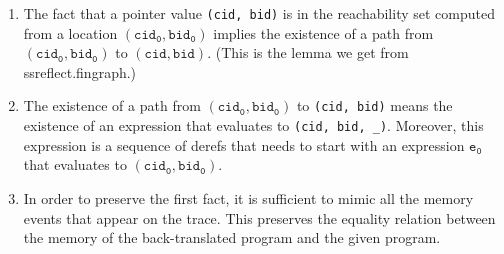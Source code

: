 \documentclass[12pt,a4paper]{article}
\begin{document}
\begin{itemize}
\begin{enumerate}
\item The fact that
a pointer value \texttt{(cid, bid)} is in the reachability set 
computed from a location $\mathtt{(cid_0, bid_0)}$
 implies the existence of a path
from $\mathtt{(cid_0, bid_0)}$ to $\mathtt{(cid, bid)}$. (This is
the lemma we get from ssreflect.fingraph.)
\item The existence of a path from $\mathtt{(cid_0, bid_0)}$
 to \texttt{(cid, bid)}
 means the existence of an expression that evaluates to 
 \texttt{(cid, bid, \_)}. Moreover, this expression is a sequence
 of derefs that needs to start with an expression $\mathtt{e_0}$ that 
 evaluates to $\mathtt{(cid_0, bid_0)}$.

\item In order to preserve the first fact,
 it is sufficient to mimic all the memory events that appear
 on the trace. This preserves the equality relation between
 the memory of the back-translated program and the given program.
\end{enumerate}

\end{itemize}
\end{document}
